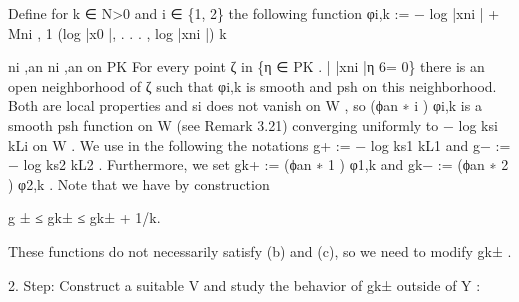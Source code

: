 \documentclass[
  10pt,
]{article}
\newenvironment{Shaded}{}{}
\newcommand{\NormalTok}[1]{#1}
\begin{document}
\begin{Shaded}
\begin{Highlighting}[]
\NormalTok{     Define for k ∈ N\textgreater{}0 and i ∈ \{1, 2\} the following function}
\NormalTok{                            φi,k := − log |xni | + Mni , 1 (log |x0 |, . . . , log |xni |)}
\NormalTok{                                                              k}

\NormalTok{    ni ,an                            ni ,an}
\NormalTok{on PK      For every point ζ in \{η ∈ PK}
\NormalTok{           .                                 | |xni |η 6= 0\} there is an open neighborhood}
\NormalTok{of ζ such that φi,k is smooth and psh on this neighborhood. Both are local properties}
\NormalTok{and si does not vanish on W , so (ϕan ∗}
\NormalTok{                                   i ) φi,k is a smooth psh function on W (see Remark}
\NormalTok{3.21) converging uniformly to − log ksi kLi on W . We use in the following the notations}
\NormalTok{g+ := − log ks1 kL1 and g− := − log ks2 kL2 . Furthermore, we set gk+ := (ϕan  ∗}
\NormalTok{                                                                            1 ) φ1,k and}
\NormalTok{gk− := (ϕan ∗}
\NormalTok{         2 ) φ2,k . Note that we have by construction}

\NormalTok{                                              g ± ≤ gk± ≤ gk± + 1/k.}

\NormalTok{     These functions do not necessarily satisfy (b) and (c), so we need to modify gk± .}

\NormalTok{      2. Step: Construct a suitable V and study the behavior of gk± outside of Y :}



\end{Highlighting}
\end{Shaded}
\end{document}
